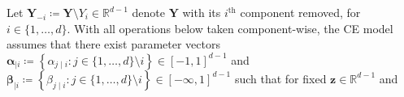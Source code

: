 \documentclass[
  12pt]{article}
\DeclareMathOperator{\CE}{\mathrm{CE}}
\begin{document}
Let $\symbf{Y}_{-i} \coloneq \symbf{Y} \setminus Y_i \in \mathbb{R}^{d-1}$ denote $\symbf{Y}$ with its $i^{\text{th}}$ component removed, for $i \in \{1, \ldots, d\}$.
With all operations below taken component-wise, the CE model assumes that there exist parameter vectors $\symbf{\alpha}_{\mid i} \coloneqq \left\{\alpha_{j \mid i} : j\in\{1,\dots,d\}\setminus i \right\} \in [-1, 1]^{d-1}$ and $\symbf{\beta}_{\mid i} \coloneqq \left\{\beta_{j \mid i} : j\in\{1,\dots,d\}\setminus i \right\} \in [-\infty, 1]^{d-1}$ such that for fixed $\symbf{z} \in \mathbb{R}^{d-1}$ and %
\end{document}
